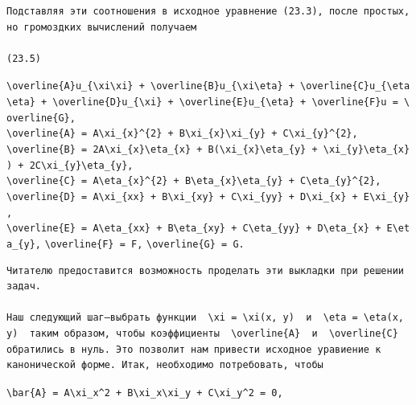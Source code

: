 \documentclass[
  ukrainian,
]{article}
\begin{document}
\begin{verbatim}
Подставляя эти соотношения в исходное уравнение (23.3), после простых, но громоздких вычислений получаем

(23.5)
\end{verbatim}

\texttt{\textbackslash{}overline\{A\}u\_\{\textbackslash{}xi\textbackslash{}xi\}\ +\ \textbackslash{}overline\{B\}u\_\{\textbackslash{}xi\textbackslash{}eta\}\ +\ \textbackslash{}overline\{C\}u\_\{\textbackslash{}eta\textbackslash{}eta\}\ +\ \textbackslash{}overline\{D\}u\_\{\textbackslash{}xi\}\ +\ \textbackslash{}overline\{E\}u\_\{\textbackslash{}eta\}\ +\ \textbackslash{}overline\{F\}u\ =\ \textbackslash{}overline\{G\},}
\texttt{\textbackslash{}overline\{A\}\ =\ A\textbackslash{}xi\_\{x\}\^{}\{2\}\ +\ B\textbackslash{}xi\_\{x\}\textbackslash{}xi\_\{y\}\ +\ C\textbackslash{}xi\_\{y\}\^{}\{2\},}
\texttt{\textbackslash{}overline\{B\}\ =\ 2A\textbackslash{}xi\_\{x\}\textbackslash{}eta\_\{x\}\ +\ B(\textbackslash{}xi\_\{x\}\textbackslash{}eta\_\{y\}\ +\ \textbackslash{}xi\_\{y\}\textbackslash{}eta\_\{x\})\ +\ 2C\textbackslash{}xi\_\{y\}\textbackslash{}eta\_\{y\},}
\texttt{\textbackslash{}overline\{C\}\ =\ A\textbackslash{}eta\_\{x\}\^{}\{2\}\ +\ B\textbackslash{}eta\_\{x\}\textbackslash{}eta\_\{y\}\ +\ C\textbackslash{}eta\_\{y\}\^{}\{2\},}
\texttt{\textbackslash{}overline\{D\}\ =\ A\textbackslash{}xi\_\{xx\}\ +\ B\textbackslash{}xi\_\{xy\}\ +\ C\textbackslash{}xi\_\{yy\}\ +\ D\textbackslash{}xi\_\{x\}\ +\ E\textbackslash{}xi\_\{y\},}
\texttt{\textbackslash{}overline\{E\}\ =\ A\textbackslash{}eta\_\{xx\}\ +\ B\textbackslash{}eta\_\{xy\}\ +\ C\textbackslash{}eta\_\{yy\}\ +\ D\textbackslash{}eta\_\{x\}\ +\ E\textbackslash{}eta\_\{y\},}
\texttt{\textbackslash{}overline\{F\}\ =\ F,}
\texttt{\textbackslash{}overline\{G\}\ =\ G.}

\begin{verbatim}
Читателю предоставится возможность проделать эти выкладки при решении задач.

Наш следующий шаг—выбрать функции  \xi = \xi(x, y)  и  \eta = \eta(x, y)  таким образом, чтобы коэффициенты  \overline{A}  и  \overline{C}  обратились в нуль. Это позволит нам привести исходное уравиение к канонической форме. Итак, необходимо потребовать, чтобы
\end{verbatim}

\texttt{\textbackslash{}bar\{A\}\ =\ A\textbackslash{}xi\_x\^{}2\ +\ B\textbackslash{}xi\_x\textbackslash{}xi\_y\ +\ C\textbackslash{}xi\_y\^{}2\ =\ 0,}
\end{document}

